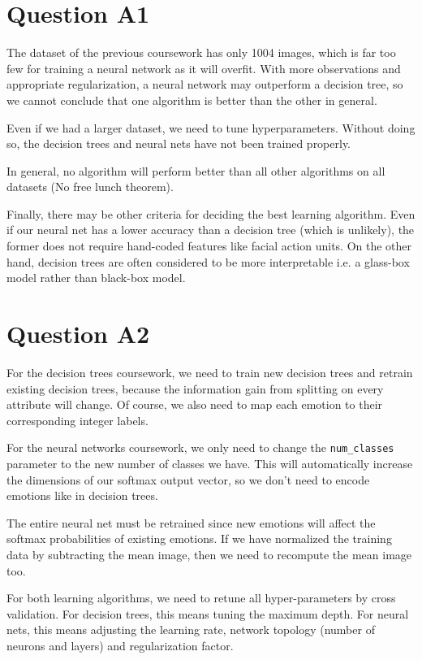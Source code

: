 \documentclass[12pt, a4paper]{article}
\begin{document}
\section*{Question A1}

The dataset of the previous coursework has only 1004 images, which is far too few for training a neural network as it will overfit. With more observations and appropriate regularization, a neural network may outperform a decision tree, so we cannot conclude that one algorithm is better than the other in general.\par
\bigskip
Even if we had a larger dataset, we need to tune hyperparameters. Without doing so, the decision trees and neural nets have not been trained properly.\par
\bigskip
In general, no algorithm will perform better than all other algorithms on all datasets (No free lunch theorem).\par
\bigskip
Finally, there may be other criteria for deciding the best learning algorithm. Even if our neural net has a lower accuracy than a decision tree (which is unlikely), the former does not require hand-coded features like facial action units. On the other hand, decision trees are often considered to be more interpretable i.e. a glass-box model rather than black-box model.

\section*{Question A2}

For the decision trees coursework, we need to train new decision trees and retrain existing decision trees, because the information gain from splitting on every attribute will change. Of course, we also need to map each emotion to their corresponding integer labels.\par
\bigskip
For the neural networks coursework, we only need to change the \texttt{num\_classes} parameter to the new number of classes we have. This will automatically increase the dimensions of our softmax output vector, so we don't need to encode emotions like in decision trees.\par
\bigskip
The entire neural net must be retrained since new emotions will affect the softmax probabilities of existing emotions. If we have normalized the training data by subtracting the mean image, then we need to recompute the mean image too.\par
\bigskip
For both learning algorithms, we need to retune all hyper-parameters by cross validation. For decision trees, this means tuning the maximum depth. For neural nets, this means adjusting the learning rate, network topology (number of neurons and layers) and regularization factor.
\end{document}
